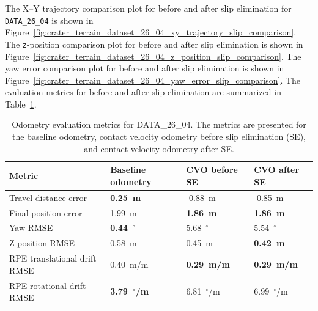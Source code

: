 \documentclass[report.tex]{subfiles}
\begin{document}
    The X--Y trajectory comparison plot for before and after slip elimination for \texttt{DATA\_26\_04} is shown in Figure~\ref{fig:crater_terrain_dataset_26_04_xy_trajectory_slip_comparison}. The \texttt{z}-position comparison plot for before and after slip elimination is shown in Figure~\ref{fig:crater_terrain_dataset_26_04_z_position_slip_comparison}. The yaw error comparison plot for before and after slip elimination is shown in Figure~\ref{fig:crater_terrain_dataset_26_04_yaw_error_slip_comparison}. The evaluation metrics for before and after slip elimination are summarized in Table~\ref{tab:odometry_metrics_data-26-04_beforeAfter_slip_elimination}.
    
          
    \begin{table}[!htbp]
    \centering
    \caption[Odometry evaluation metrics for DATA\_26\_04.]{ Odometry evaluation metrics for DATA\_26\_04. The metrics are presented for the baseline odometry, contact velocity odometry before slip elimination (SE), and contact velocity odometry after SE.}
    \label{tab:odometry_metrics_data-26-04_beforeAfter_slip_elimination}
    \begin{tabular}{llll}
        \hline
        Metric & Baseline odometry & CVO before SE & CVO after SE \\ 
        \hline
        Travel distance error
        & \textbf{0.25~m}
        & -0.88~m
        & -0.85~m \\

        Final position error
        & 1.99~m
        & \textbf{1.86~m}
        & \textbf{1.86~m} \\

        Yaw RMSE
        & \textbf{0.44~$^\circ$}
        & 5.68~$^\circ$
        & 5.54~$^\circ$ \\

        Z position RMSE
        & 0.58~m
        & 0.45~m
        & \textbf{0.42~m} \\

        RPE translational drift RMSE
        & 0.40~m/m
        & \textbf{0.29~m/m}
        & \textbf{0.29~m/m} \\

        RPE rotational drift RMSE
        & \textbf{3.79~$^\circ$/m}
        & 6.81~$^\circ$/m
        & 6.99~$^\circ$/m \\
        \hline
    \end{tabular}
    \end{table}
    
\end{document}
